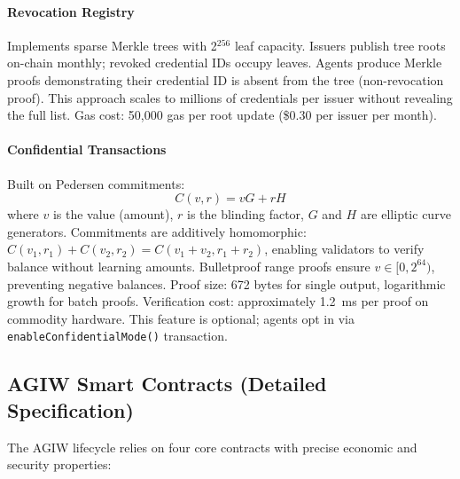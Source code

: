 \documentclass[11pt]{article}
\begin{document}
\paragraph{Revocation Registry} Implements sparse Merkle trees with 2$^{256}$ leaf capacity. Issuers publish tree roots on-chain monthly; revoked credential IDs occupy leaves. Agents produce Merkle proofs demonstrating their credential ID is absent from the tree (non-revocation proof). This approach scales to millions of credentials per issuer without revealing the full list. Gas cost: 50,000 gas per root update (\$0.30 per issuer per month).

\paragraph{Confidential Transactions} Built on Pedersen commitments:
\begin{equation}
C(v, r) = vG + rH
\end{equation}
where $v$ is the value (amount), $r$ is the blinding factor, $G$ and $H$ are elliptic curve generators. Commitments are additively homomorphic: $C(v_1, r_1) + C(v_2, r_2) = C(v_1 + v_2, r_1 + r_2)$, enabling validators to verify balance without learning amounts. Bulletproof range proofs ensure $v \in [0, 2^{64})$, preventing negative balances. Proof size: 672 bytes for single output, logarithmic growth for batch proofs. Verification cost: approximately 1.2~ms per proof on commodity hardware. This feature is optional; agents opt in via \texttt{enableConfidentialMode()} transaction.

\subsection{AGIW Smart Contracts (Detailed Specification)}
\label{sec:agiw-contracts}
The AGIW lifecycle relies on four core contracts with precise economic and security properties:
\end{document}
